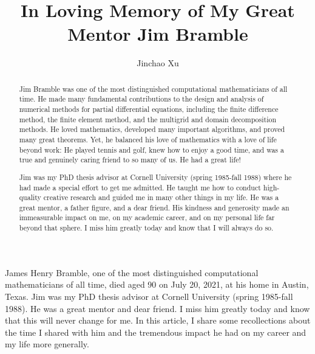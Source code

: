 \documentclass[CJK,11pt]{amsart}
\theoremstyle{definition}
\begin{document}
\begin{CJK*}{UTF8}{gbsn}
  \title{ In Loving Memory of My Great Mentor Jim Bramble}
\author{Jinchao Xu}
\begin{abstract}
Jim Bramble was one of the most distinguished computational mathematicians of all time. He made many fundamental contributions to the design and analysis of numerical methods for partial differential equations, including the finite difference method, the finite element method, and the multigrid and domain decomposition methods. He loved mathematics, developed many important algorithms, and proved many great theorems. Yet, he balanced his love of mathematics with a love of life beyond work: He played tennis and golf, knew how to enjoy a good time, and was a true and genuinely caring friend to so many of us. He had a great life! 

Jim was my PhD thesis advisor at Cornell University (spring 1985-fall 1988) where he had made a special effort to get me admitted. He taught me how to conduct high-quality creative research and guided me in many other things in my life. He was a great mentor, a father figure, and a dear friend. His kindness and generosity made an immeasurable impact on me, on my academic career, and on my personal life far beyond that sphere.
I miss him greatly today and know that I will always do so. 
\end{abstract}
\maketitle

James Henry Bramble, one of the most distinguished computational mathematicians of all time, died aged 90 on July 20, 2021, at his home in Austin, Texas. Jim was my PhD thesis advisor at Cornell University (spring 1985-fall 1988). He was a great mentor and dear friend. I miss him greatly today and know that this will never change for me. In this article, I share some recollections about the time I shared with him and the tremendous impact he had on my career and my life more generally. 


\end{CJK*}
\end{document}

